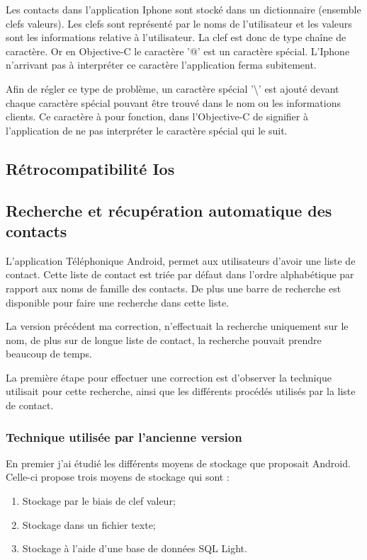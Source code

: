 Les contacts dans l'application Iphone sont stocké dans un dictionnaire (ensemble clefs valeurs). Les clefs sont représenté par le noms de l'utilisateur et les valeurs sont les informations relative à l'utilisateur. La clef est donc de type chaîne de caractère. Or en Objective-C le caractère '@' est un caractère spécial. L'Iphone n'arrivant pas à interpréter ce caractère l'application ferma subitement.

Afin de régler ce type de problème, un caractère spécial '\textbackslash' est ajouté devant chaque caractère spécial pouvant être trouvé dans le nom ou les informations clients. Ce caractère à pour fonction, dans l'Objective-C de signifier à l'application de ne pas interpréter le caractère spécial qui le suit. 

\subsection{Rétrocompatibilité Ios}
\subsection{Recherche et récupération automatique des contacts}

L'application Téléphonique Android, permet aux utilisateurs d'avoir une liste de contact. Cette liste de contact est triée par défaut dans l'ordre alphabétique par rapport aux noms de famille des contacts. De plus une barre de recherche est disponible pour faire une recherche dans cette liste.

La version précédent ma correction, n'effectuait la recherche uniquement sur le nom, de plus sur de longue liste de contact, la recherche pouvait prendre beaucoup de temps.

La première étape pour effectuer une correction est d'observer la technique utilisait pour cette recherche, ainsi que les différents procédés utilisés par la liste de contact.


\subsubsection{Technique utilisée par l'ancienne version}

En premier j'ai étudié les différents moyens de stockage que proposait Android. Celle-ci propose trois moyens de stockage qui sont :

\begin{enumerate}
	\item Stockage par le biais de clef valeur;
	\item Stockage dans un fichier texte;
	\item Stockage à l'aide d'une base de données SQL Light.
\end{enumerate}

